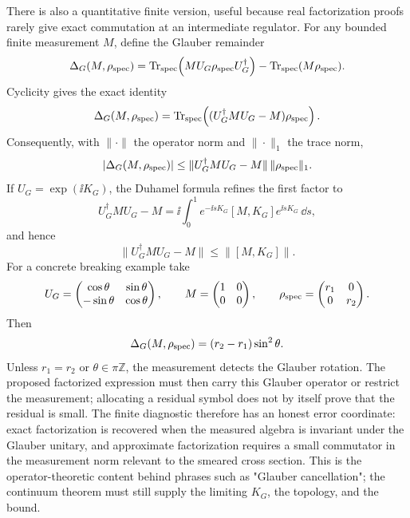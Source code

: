 There is also a quantitative finite version, useful because real
factorization proofs rarely give exact commutation at an intermediate
regulator.  For any bounded finite measurement \(M\), define the Glauber
remainder
\begin{equation}
  \Delta_G(M,\rho_{\rm spec})
  =
  \operatorname{Tr}_{\rm spec}
  \!\left(MU_G\rho_{\rm spec}U_G^\dagger\right)
  -
  \operatorname{Tr}_{\rm spec}(M\rho_{\rm spec}).
  \label{eq:glauber-finite-remainder-definition}
\end{equation}
Cyclicity gives the exact identity
\begin{equation}
  \Delta_G(M,\rho_{\rm spec})
  =
  \operatorname{Tr}_{\rm spec}
  \!\left((U_G^\dagger M U_G-M)\rho_{\rm spec}\right).
  \label{eq:glauber-finite-remainder-commutator}
\end{equation}
Consequently, with \(\|\cdot\|\) the operator norm and
\(\|\cdot\|_1\) the trace norm,
\begin{equation}
  |\Delta_G(M,\rho_{\rm spec})|
  \le
  \|U_G^\dagger M U_G-M\|\,\|\rho_{\rm spec}\|_1 .
  \label{eq:glauber-finite-remainder-bound}
\end{equation}
If \(U_G=\exp(\ii K_G)\), the Duhamel formula refines the first factor to
\[
  U_G^\dagger M U_G-M
  =
  \ii\int_0^1
  e^{-\ii sK_G}[M,K_G]e^{\ii sK_G}\,\dd s ,
\]
and hence
\[
  \|U_G^\dagger M U_G-M\|
  \le
  \|[M,K_G]\| .
\]
For a concrete breaking example take
\[
  U_G=
  \begin{pmatrix}
    \cos\theta&\sin\theta\\
    -\sin\theta&\cos\theta
  \end{pmatrix},
  \qquad
  M=
  \begin{pmatrix}
    1&0\\0&0
  \end{pmatrix},
  \qquad
  \rho_{\rm spec}=
  \begin{pmatrix}
    r_1&0\\0&r_2
  \end{pmatrix}.
\]
Then
\[
  \Delta_G(M,\rho_{\rm spec})
  =
  (r_2-r_1)\sin^2\theta .
\]
Unless \(r_1=r_2\) or \(\theta\in\pi\mathbb Z\), the measurement detects the
Glauber rotation.  The proposed factorized expression must then carry this
Glauber operator or restrict the measurement; allocating a residual symbol
does not by itself prove that the residual is small.
The finite diagnostic therefore has an honest error coordinate: exact
factorization is recovered when the measured algebra is invariant under the
Glauber unitary, and approximate factorization requires a small commutator in
the measurement norm relevant to the smeared cross section.  This is the
operator-theoretic content behind phrases such as "Glauber cancellation";
the continuum theorem must still supply the limiting \(K_G\), the topology,
and the bound.

